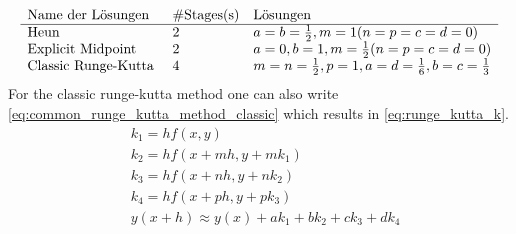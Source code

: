 \begin{equation}\label{eq:runge_kutta_method_types}
\begin{array}{lll}
\text {Name der Lösungen} & \# \text {Stages} $(s)$ & \text {Lösungen}\\
\hline
\text {Heun } & 2 & a=b=\frac{1}{2}, m=1(n=p=c=d=0) \\
\text {Explicit Midpoint } & 2 & a=0, b=1, m=\frac{1}{2}(n=p=c=d=0) \\
\text {Classic Runge-Kutta } & 4 & m=n=\frac{1}{2}, p=1, a=d=\frac{1}{6}, b=c=\frac{1}{3}
\end{array}
\end{equation}
For the classic runge-kutta method one can also write \autoref{eq:common_runge_kutta_method_classic} which results in \autoref{eq:runge_kutta_k}.
\begin{equation}\label{eq:common_runge_kutta_method_classic}
\begin{aligned}
& k_1=h f(x, y) \\
& k_2=h f\left(x+m h, y+m k_1\right) \\
& k_3=h f\left(x+n h, y+n k_2\right) \\
& k_4=h f\left(x+p h, y+p k_3\right) \\
& y(x+h) \approx y(x)+a k_1+b k_2+c k_3+d k_4
\end{aligned}
\end{equation}

